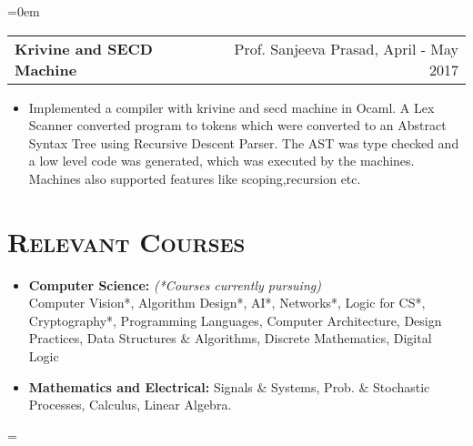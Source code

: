 \documentclass{article}
\makeatletter
\newenvironment{longversion}{}{} %
\newenvironment{absolutelynopagebreak}
  {\par\nobreak\vfil\penalty0\vfilneg
   \vtop\bgroup}
  {\par\xdef\tpd{\the\prevdepth}\egroup
   \prevdepth=\tpd}
\newcommand{\headerrow}[2]
{\begin{tabular*}{\linewidth}{l@{\extracolsep{\fill}}r}
	#1 &
	#2 \\
\end{tabular*}}
\newcommand{\tmpsection}[1]{}
\let\tmpsection=\section
\renewcommand{\section}[1]{\tmpsection*{\textsc{#1}}}
\makeatother
\begin{document}
\begin{absolutelynopagebreak}
\begin{longversion}
\begin{list} {}{\leftmargin=0em}
\item[]
\headerrow{ \textbf{Krivine and SECD Machine}} {Prof. Sanjeeva Prasad, April - May 2017}
\begin{itemize} \item[] 
Implemented a compiler with krivine and secd machine in Ocaml. A Lex Scanner converted program to tokens which were converted to an Abstract Syntax Tree using Recursive Descent Parser. The AST was type checked and a low level code was generated, which was executed by the machines. Machines also supported features like scoping,recursion etc.
\end{itemize}



\end{list}


\end{longversion}

\begin{longversion}
\section{Relevant Courses}
\begin{itemize}
\setlength\itemsep{-1em}
\item \textbf{Computer Science:} \hfill \textit{(*Courses currently pursuing)}\\
Computer Vision*, Algorithm Design*, AI*, Networks*, Logic for CS*, Cryptography*, Programming Languages, Computer Architecture, Design Practices, Data Structures \& Algorithms, Discrete Mathematics, Digital Logic\\

\item \textbf{Mathematics and Electrical:}
Signals \& Systems, Prob. \& Stochastic Processes, Calculus, Linear Algebra.\\


\end{itemize}
\end{longversion}
\end{absolutelynopagebreak}
\end{document}
